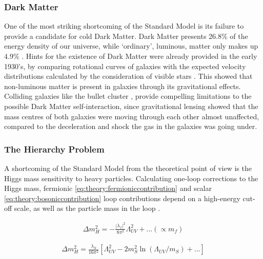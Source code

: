 \subsubsection{Dark Matter}
One of the most striking shortcoming of the Standard Model is its failure to provide a candidate for cold Dark Matter.
Dark Matter presents 26.8\% of the energy density of our universe, while `ordinary', luminous, matter only makes up 4.9\% \cite{Planck}. 
Hints for the existence of Dark Matter were already provided in the early 1930's, by comparing rotational curves of galaxies with the expected velocity distributions calculated by the consideration of visible stars \cite{Zwicky}. This showed that non-luminous matter is present in galaxies through its gravitational effects. 
Colliding galaxies like the bullet cluster \cite{BulletCluster} \cite{CollisionGalaxies}, provide compelling limitations to the possible Dark Matter self-interaction, since gravitational lensing showed that the mass centres of both galaxies were moving through each other almost unaffected, compared to the deceleration and shock the gas in the galaxies was going under. 



\subsubsection{The Hierarchy Problem}

A shortcoming of the Standard Model from the theoretical point of view is the Higgs mass sensitivity to heavy particles.
Calculating one-loop corrections to the Higgs mass, fermionic \eqref{eq:theory:fermioniccontribution} and scalar \eqref{eq:theory:bosoniccontribution} loop contributions depend on a high-energy cut-off scale, as well as the particle mass in the loop \cite{SUSYPrimer}. 

\begin{align}
\Delta m_H^2 = -\frac{|\lambda_f|^2}{8\pi^2}\Lambda^2_{UV} + ... (\propto m_f)\label{eq:theory:fermioniccontribution}
\end{align}

\begin{align}
\Delta m_H^2 = \frac{\lambda_S}{16 \pi^2} [ \Lambda^2_{UV} -2m_S^2 \ln (\Lambda_{UV}/m_S) + ...] \label{eq:theory:bosoniccontribution}
\end{align}

